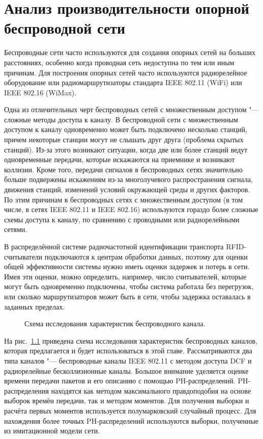 \chapter{Анализ производительности опорной беспроводной сети}\label{ch:ch4}
Беспроводные сети часто используются для создания опорных сетей на больших расстояниях, особенно когда проводная сеть недоступна по тем или иным причинам. Для построения опорных сетей часто используются радиорелейное оборудование или радиомаршрутизаторы стандарта IEEE 802.11 (WiFi) или IEEE 802.16 (WiMax).

Одна из отличительных черт беспроводных сетей с множественным доступом "--- сложные методы доступа к каналу. В беспроводной сети с множественным доступом к каналу одновременно может быть подключено несколько станций, причем некоторые станции могут не слышать друг друга (проблема скрытых станций). Из-за этого возникают ситуации, когда две или более станций ведут одновременные передачи, которые искажаются на приемнике и возникают коллизии. Кроме того, передачи сигналов в беспроводных сетях значительно больше подвержены искажениям из-за многолучевого распространения сигнала, движения станций, изменений условий окружающей среды и других факторов. По этим причинам в беспроводных сетях с множественным доступом (в том числе, в сетях IEEE 802.11 и IEEE 802.16) используются гораздо более сложные схемы доступа к каналу, по сравнению с проводными или радиорелейными сетями.

В распределённой системе радиочастотной идентификации транспорта RFID-считыватели подключаются к центрам обработки данных, поэтому для оценки общей эффективности системы нужно иметь оценки задержек и потерь в сети. Имея эти оценки, можно определить, например, число считывателей, которые могут быть одновременно подключены, чтобы система работала без перегрузок, или сколько маршрутизаторов может быть в сети, чтобы задержка оставалась в заданных пределах.

\begin{figure}[h]
  \caption{Схема исследования характеристик беспроводного канала.}
  \label{fig:ch4_research_schema}
\end{figure}

На рис.~\ref{fig:ch4_research_schema} приведена схема исследования характеристик беспроводных каналов, которая предлагается и будет использоваться в этой главе. Рассматриваются два типа каналов "--- беспроводные каналы IEEE 802.11 с методом доступа DCF и радиорелейные бесколлизионные каналы. Большое внимание уделяется оценке времени передачи пакетов и его описанию с помощью PH-распределений. PH-распределения находятся как методом максимального правдоподобия на основе выборок времён передачи, так и методом моментов. Для получения выборки и расчёта первых моментов используется полумарковский случайный процесс. Для нахождения более точных PH-распределений используются выборки, полученные из имитационной модели сети.

